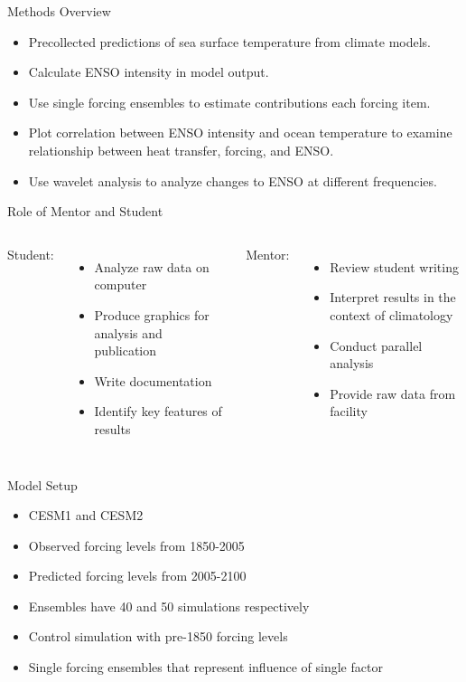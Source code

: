 \documentclass{beamer}
\begin{document}
\begin{frame}{Methods Overview}
  \begin{itemize}
  \item Precollected predictions of sea surface temperature from climate models.
  \item Calculate ENSO intensity in model output.
  \item Use single forcing ensembles to estimate contributions each forcing item.
  \item Plot correlation between ENSO intensity and ocean temperature to examine relationship between heat transfer, forcing, and ENSO.
  \item Use wavelet analysis to analyze changes to ENSO at different frequencies.
  \end{itemize}
\end{frame}

\begin{frame}{Role of Mentor and Student}
  \begin{columns}[t]
    Student:
    \begin{itemize}
    \item Analyze raw data on computer
    \item Produce graphics for analysis and publication
    \item Write documentation
    \item Identify key features of results
    \end{itemize}
    Mentor:
    \begin{itemize}
    \item Review student writing
    \item Interpret results in the context of climatology
    \item Conduct parallel analysis
    \item Provide raw data from facility
    \end{itemize}
  \end{columns}

\end{frame}

\begin{frame}{Model Setup}
  \begin{itemize}
  \item CESM1 \citep{kay2015community} and CESM2 \citep{danabasoglu2020community}
  \item Observed forcing levels from 1850-2005
  \item Predicted forcing levels from 2005-2100
  \item Ensembles have 40 and 50 simulations respectively
  \item Control simulation with pre-1850 forcing levels
  \item Single forcing ensembles that represent influence of single factor
  \end{itemize}
\end{frame}
\end{document}
